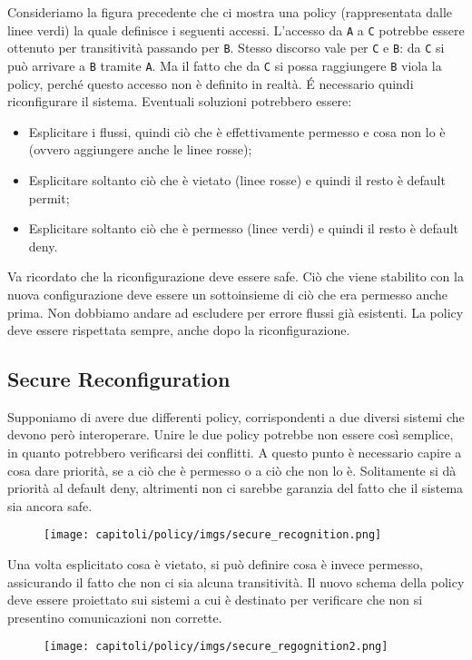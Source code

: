 Consideriamo la figura precedente che ci mostra una policy (rappresentata dalle
linee verdi) la quale definisce i seguenti accessi.
L'accesso da \verb|A| a \verb|C| potrebbe essere ottenuto per transitività
passando per \verb|B|.
Stesso discorso vale per \verb|C| e \verb|B|: da \verb|C| si può arrivare a
\verb|B| tramite \verb|A|. Ma il fatto che
da \verb|C| si possa raggiungere \verb|B| viola la policy, perché questo accesso
non è definito in realtà. \'{E} necessario quindi riconfigurare il sistema.
Eventuali soluzioni potrebbero essere:
\begin{itemize}
    \item Esplicitare i flussi, quindi ciò che è effettivamente permesso e
          cosa non lo
          è (ovvero aggiungere anche le linee rosse);
    \item Esplicitare soltanto ciò che è vietato (linee rosse) e quindi il
          resto è default permit;
    \item Esplicitare soltanto ciò che è permesso (linee verdi) e quindi il
          resto è default deny.
\end{itemize}
Va ricordato che la riconfigurazione deve essere safe. Ciò che viene stabilito con la nuova configurazione deve essere un sottoinsieme di ciò che era permesso anche prima. Non dobbiamo andare ad escludere per errore flussi già esistenti. La policy deve essere rispettata sempre, anche dopo la riconfigurazione.

\subsection{Secure Reconfiguration}

Supponiamo di avere due differenti policy, corrispondenti a due diversi sistemi
che devono però
interoperare. Unire le due policy potrebbe non essere così semplice, in quanto
potrebbero
verificarsi dei conflitti.
A questo punto è necessario capire a cosa dare priorità, se a ciò che è permesso
o a ciò che non lo è. Solitamente si dà priorità al default deny, altrimenti
non ci sarebbe garanzia del fatto che il sistema sia ancora safe.

\begin{figure}[H]
    \centering
    \texttt{[image: capitoli/policy/imgs/secure\_recognition.png]}
\end{figure}

Una volta esplicitato cosa è vietato, si può definire cosa è invece permesso,
assicurando il fatto
che non ci sia alcuna transitività.
Il nuovo schema della policy deve essere proiettato sui sistemi a cui è
destinato per verificare che
non si presentino comunicazioni non corrette.

\begin{figure}[H]
    \centering
    \texttt{[image: capitoli/policy/imgs/secure\_regognition2.png]}
\end{figure}
